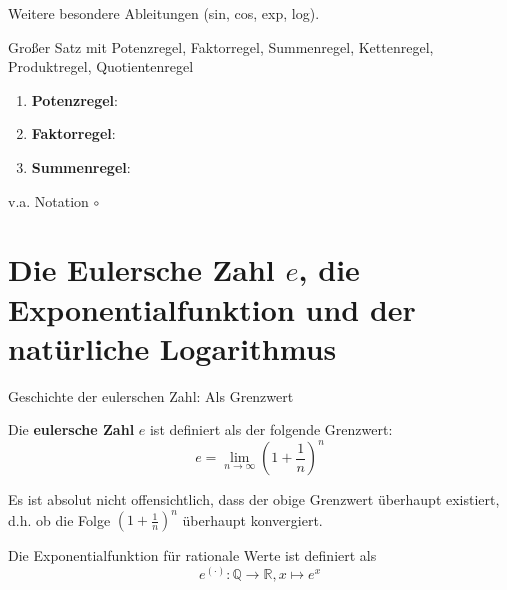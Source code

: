 Weitere besondere Ableitungen (sin, cos, exp, log). 

Großer Satz mit Potenzregel, Faktorregel, Summenregel, Kettenregel, Produktregel, Quotientenregel
\begin{theorem}
    \begin{enumerate}
        \item \textbf{Potenzregel}:
        \item \textbf{Faktorregel}:
        \item \textbf{Summenregel}:
    \end{enumerate}
\end{theorem}

\begin{theorem}[Produktregel]
    
\end{theorem}

\begin{definition}[Verkettung]
    v.a. Notation \(\circ\)
\end{definition}

\begin{theorem}[Kettenregel]
    
\end{theorem}

\begin{theorem}[Quotientenregel]
    
\end{theorem}

\section[\(e\)-Funktion]{Die Eulersche Zahl \(e\), die Exponentialfunktion und der natürliche Logarithmus}
Geschichte der eulerschen Zahl: Als Grenzwert 
\begin{definition}
    Die \textbf{eulersche Zahl} \(e\) ist definiert als der folgende Grenzwert: 
    \begin{equation*}
        e = \lim_{n\to\infty}\left(1+\frac{1}{n}\right)^n
    \end{equation*}
\end{definition}
Es ist absolut nicht offensichtlich, dass der obige Grenzwert überhaupt existiert, d.h. ob die Folge \(\left(1+\frac{1}{n}\right)^n\) überhaupt konvergiert. 

\begin{definition}
    Die Exponentialfunktion für rationale Werte ist definiert als 
    \begin{equation*}
        e^{(\cdot)}: \mathbb Q \to \mathbb R, x \mapsto e^x
    \end{equation*}
\end{definition}

